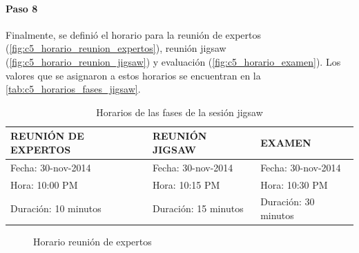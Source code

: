 \paragraph{Paso 8}
Finalmente, se definió el horario para la reunión de expertos (\autoref{fig:c5_horario_reunion_expertos}), reunión jigsaw (\autoref{fig:c5_horario_reunion_jigsaw}) y evaluación (\autoref{fig:c5_horario_examen}). Los valores que se asignaron a estos horarios se encuentran en la \autoref{tab:c5_horarios_fases_jigsaw}.

\begin{longtable}{|l|l|l|}
	\caption{Horarios de las fases de la sesión jigsaw}	
	\label{tab:c5_horarios_fases_jigsaw}\\
	\toprule[0.8mm]
	REUNIÓN DE EXPERTOS & REUNIÓN JIGSAW & EXAMEN \\
	\midrule
	Fecha: 30-nov-2014 & Fecha: 30-nov-2014 & Fecha: 30-nov-2014\\
	Hora: 10:00 PM & Hora: 10:15 PM & Hora: 10:30 PM\\
	Duración: 10 minutos & Duración: 15 minutos & Duración: 30 minutos\\
	\bottomrule[0.8mm]

\end{longtable}
 
\begin{figure}[h!]
	\centering
	\caption{Horario reunión de expertos}
	\label{fig:c5_horario_reunion_expertos}
\end{figure}

